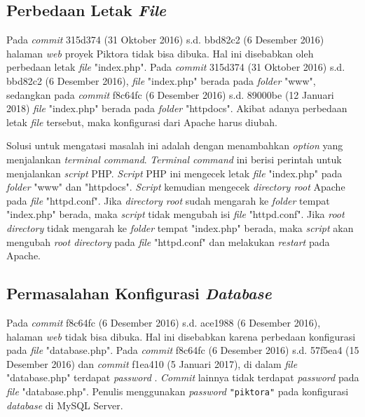 \subsection{Perbedaan Letak \textit{File}}
\label{subsec:perbedaan_letak_file}
Pada \textit{commit} 315d374 (31 Oktober 2016) s.d. bbd82c2 (6 Desember 2016) halaman \textit{web} proyek Piktora tidak bisa dibuka. Hal ini disebabkan oleh perbedaan letak \textit{file} "index.php". Pada \textit{commit} 315d374 (31 Oktober 2016) s.d. bbd82c2 (6 Desember 2016), \textit{file} "index.php" berada pada \textit{folder} "www", sedangkan pada \textit{commit} f8c64fc (6 Desember 2016) s.d. 89000be (12 Januari 2018) \textit{file} "index.php" berada pada \textit{folder} "httpdocs". Akibat adanya perbedaan letak \textit{file} tersebut, maka konfigurasi dari Apache harus diubah.


Solusi untuk mengatasi masalah ini adalah dengan menambahkan \textit{option} yang menjalankan \textit{terminal command}. \textit{Terminal command} ini berisi perintah untuk menjalankan \textit{script} PHP. \textit{Script} PHP ini mengecek letak \textit{file} "index.php" pada \textit{folder} "www" dan "httpdocs". \textit{Script} kemudian mengecek \textit{directory root} Apache pada \textit{file} "httpd.conf".  Jika \textit{directory root} sudah mengarah ke \textit{folder} tempat "index.php" berada, maka \textit{script} tidak mengubah isi \textit{file} "httpd.conf". Jika \textit{root directory} tidak mengarah ke \textit{folder} tempat "index.php" berada, maka \textit{script} akan mengubah \textit{root directory} pada \textit{file} "httpd.conf" dan melakukan \textit{restart} pada Apache.   


\subsection{Permasalahan Konfigurasi \textit{Database}}
\label{subsec:konfigurasi_database}
Pada \textit{commit} f8c64fc (6 Desember 2016) s.d. ace1988 (6 Desember 2016), halaman \textit{web} tidak bisa dibuka. Hal ini disebabkan karena perbedaan konfigurasi pada \textit{file} "database.php". Pada \textit{commit} f8c64fc (6 Desember 2016) s.d. 57f5ea4 (15 Desember 2016) dan \textit{commit} f1ea410 (5 Januari 2017), di dalam \textit{file} "database.php" terdapat \textit{password} . \textit{Commit} lainnya tidak terdapat \textit{password} pada \textit{file} "database.php". Penulis menggunakan \textit{password} \texttt{"piktora"} pada konfigurasi \textit{database} di MySQL Server.


